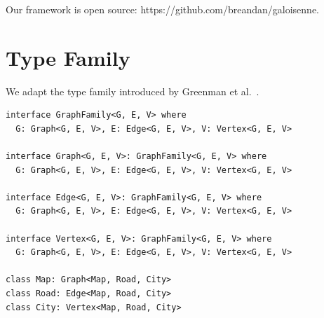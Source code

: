 \documentclass[sigplan,10pt,review,anonymous]{acmart}
\begin{document}




Our framework is open source: https://github.com/breandan/galoisenne.
\section{Type Family}

We adapt the type family introduced by Greenman et al.~\citep{greenman2014getting}.

\begin{lstlisting}
interface GraphFamily<G, E, V> where
  G: Graph<G, E, V>, E: Edge<G, E, V>, V: Vertex<G, E, V>

interface Graph<G, E, V>: GraphFamily<G, E, V> where
  G: Graph<G, E, V>, E: Edge<G, E, V>, V: Vertex<G, E, V>

interface Edge<G, E, V>: GraphFamily<G, E, V> where
  G: Graph<G, E, V>, E: Edge<G, E, V>, V: Vertex<G, E, V>

interface Vertex<G, E, V>: GraphFamily<G, E, V> where
  G: Graph<G, E, V>, E: Edge<G, E, V>, V: Vertex<G, E, V>

class Map: Graph<Map, Road, City>
class Road: Edge<Map, Road, City>
class City: Vertex<Map, Road, City>
\end{lstlisting}
\end{document}

